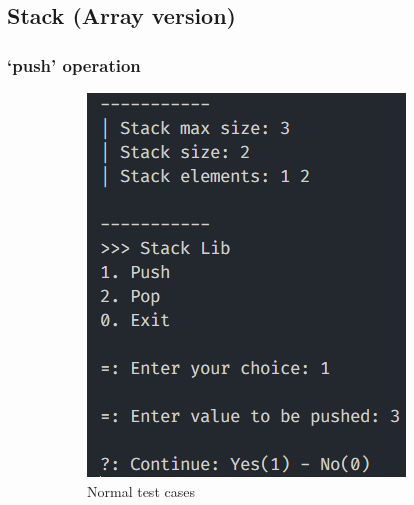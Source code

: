 \thispagestyle{empty}
\subsection{Stack (Array version)}
\subsubsection*{`push' operation}
\begin{figure}[!ht]
	\centering
	\begin{subfigure}{0.41\textwidth}
		\centering
		\includegraphics[width=\textwidth]{imgs/StackArray/push/normal.png}
		\caption{Normal test cases}\label{fig:stack_arr_push_normal}
	\end{subfigure}
	\hfill
	\begin{subfigure}{0.54\textwidth}
		\centering

\end{subfigure}
\end{figure}
